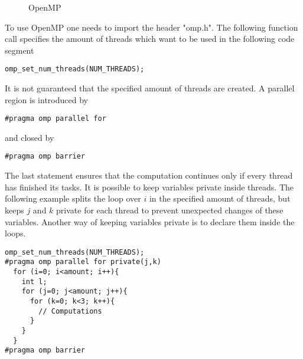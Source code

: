 \documentclass[a4paper]{article}
\begin{document}
\begin{figure}[H]
\centering
{}
\label{im:openmp}
\caption{OpenMP}
\end{figure}

To use OpenMP one needs to import the header "omp.h". The following function call specifies the amount of threads which want to be used in the following code segment

\begin{center}
\texttt{omp\_set\_num\_threads(NUM\_THREADS);}
\end{center}

It is not guaranteed that the specified amount of threads are created. A parallel region is introduced by

\begin{center}
\texttt{\#pragma omp parallel for}
\end{center}

and closed by

\begin{center}
\texttt{\#pragma omp barrier}
\end{center}

The last statement ensures that the computation continues only if every thread has finished its tasks. It is possible to keep variables private inside threads. The following example splits the loop over $i$ in the specified amount of threads, but keeps $j$ and $k$ private for each thread to prevent unexpected changes of these variables. Another way of keeping variables private is to declare them inside the loops.

\begin{lstlisting}[caption={Example: OpenMP}, label={c:openmp}]
omp_set_num_threads(NUM_THREADS);
#pragma omp parallel for private(j,k)
  for (i=0; i<amount; i++){
    int l;
    for (j=0; j<amount; j++){
      for (k=0; k<3; k++){
        // Computations
      }
    }
  }
#pragma omp barrier
\end{lstlisting}
\end{document}
